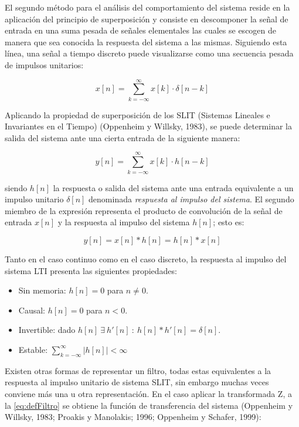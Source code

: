 \documentclass[conference]{IEEEtran}
\begin{document}
El segundo método para el análisis del comportamiento del sistema reside en la aplicación del principio de superposición y consiste en descomponer la señal de entrada en una suma pesada de señales elementales las cuales se escogen de manera que sea conocida la respuesta del sistema a las mismas. Siguiendo esta línea, una señal a tiempo discreto puede visualizarse como una secuencia pesada de impulsos unitarios:

\begin{equation}
    x[n] = \sum_{k=-\infty}^{\infty}{x[k] \cdot \delta [n - k] }
\end{equation}

Aplicando la propiedad de superposición de los SLIT (Sistemas Lineales e Invariantes en el Tiempo) (Oppenheim y Willsky, 1983), se puede determinar la salida del sistema ante una cierta entrada de la siguiente manera:

\begin{equation}
    y[n] = \sum_{k=-\infty}^{\infty}{x[k] \cdot h[n-k]}
\end{equation}

siendo \(h[n]\) la respuesta o salida del sistema ante una entrada equivalente a un impulso unitario \(\delta [n]\) denominada \emph{respuesta al impulso del sistema}. El segundo miembro de la expresión representa el producto de convolución de la señal de entrada \(x[n]\) y la respuesta al impulso del sistema \(h[n]\); esto es:

\begin{equation}
    y[n] = x[n] * h[n] = h[n] * x[n]
\end{equation}

Tanto en el caso continuo como en el caso discreto, la respuesta al impulso del sistema LTI presenta las siguientes propiedades:

\begin{itemize}
\item Sin memoria: \(h[n]=0\) para \(n \neq 0\).
\item Causal: \(h[n]=0\) para \(n<0\).
\item Invertible: dado \(h[n]\: \exists \:h'[n]\::\:h[n]*h'[n]=\delta[n]\).
\item Estable: \(\sum_{k=-\infty}^{\infty}{|h[n]|<\infty}\)
\end{itemize}

Existen otras formas de representar un filtro, todas estas equivalentes a la respuesta al impulso unitario de sistema SLIT, sin embargo muchas veces conviene más una u otra representación. En el caso aplicar la transformada Z, a la \ref{eq:defFiltro} se obtiene la función de transferencia del sistema (Oppenheim y Willsky, 1983; Proakis y Manolakis; 1996; Oppenheim y Schafer, 1999):
\end{document}
